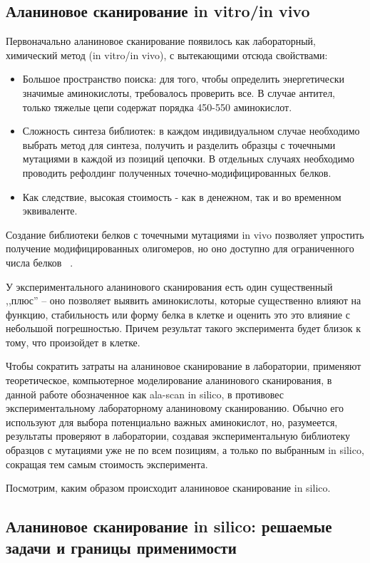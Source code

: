 \subsection{Аланиновое сканирование in vitro/in vivo}
Первоначально аланиновое сканирование появилось как лабораторный, химический метод (in vitro/in vivo), с вытекающими отсюда свойствами:
\begin{itemize}
\item Большое пространство поиска: для того, чтобы определить энергетически значимые аминокислоты, требовалось проверить все. В случае антител, только тяжелые цепи содержат порядка 450-550 аминокислот.
\item Сложность синтеза библиотек: в каждом индивидуальном случае необходимо выбрать метод для синтеза, получить и разделить образцы с точечными мутациями в каждой из позиций цепочки. В отдельных случаях необходимо проводить рефолдинг полученных точечно-модифицированных белков.
\item Как следствие, высокая стоимость - как в денежном, так и во временном эквиваленте.
\end{itemize}

Создание библиотеки белков с точечными мутациями in vivo позволяет упростить получение модифицированных олигомеров, но оно доступно для ограниченного числа белков ~\cite{alascan2001}.

У экспериментального аланинового  сканирования есть один существенный ,,плюс'' -- оно позволяет выявить  аминокислоты, которые существенно влияют на функцию, стабильность или форму белка в клетке и оценить это это влияние с небольшой погрешностью. Причем результат такого эксперимента будет близок к тому, что произойдет в клетке. 

Чтобы сократить затраты на аланиновое сканирование в лаборатории, применяют теоретическое, компьютерное моделирование аланинового сканирования, в данной работе обозначенное как ala-scan in silico, в противовес экспериментальному лабораторному аланиновому сканированию. Обычно его используют для выбора потенциально важных аминокислот, но, разумеется, результаты проверяют в лаборатории, создавая экспериментальную библиотеку образцов с мутациями уже не по всем позициям, а только по выбранным in silico, сокращая тем самым стоимость эксперимента.

Посмотрим, каким образом происходит аланиновое сканирование in silico.

\subsection{Аланиновое сканирование in silico: решаемые задачи и границы применимости}

